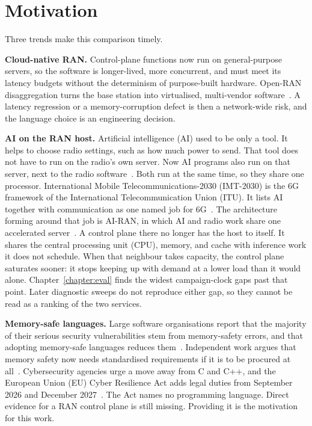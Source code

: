 \documentclass[english,oneside,a4paper,censored,csm,software-track-2020]{HYthesisML}
\begin{document}
\section{Motivation}\label{sec:motivation}
Three trends make this comparison timely.

\begin{compactitem}
\item \textbf{Cloud-native RAN.} Control-plane functions now run on general-purpose
servers, so the software is longer-lived, more concurrent, and must meet
its latency budgets without the determinism of purpose-built hardware.
Open-RAN disaggregation turns the base station into virtualised,
multi-vendor software~\cite{polese2023oran}. A latency regression or a
memory-corruption defect is then a network-wide risk, and the language
choice is an engineering decision.

\item \textbf{AI on the RAN host.} Artificial intelligence (AI) used to be only a tool.
It helps to choose radio settings, such as how much power to send. That tool does
not have to run on the radio's own server. Now AI programs also run on that
server, next to the radio software~\cite{polese2026airan}. Both run at the same
time, so they share one processor. International Mobile
Telecommunications-2030 (IMT-2030) is the 6G framework of the
International Telecommunication Union (ITU). It lists AI together with
communication as one named job for 6G~\cite{itu2023imt2030}. The architecture
forming around that job is AI-RAN, in which AI and radio work share one
accelerated server~\cite{airan2026orchestrator}. A control plane there
no longer has the host to itself. It shares the central processing unit
(CPU), memory, and cache with inference work it does not schedule. When
that neighbour takes capacity, the control plane saturates sooner: it
stops keeping up with demand at a lower load than it would alone.
Chapter~\ref{chapter:eval} finds the widest campaign-clock gaps past
that point. Later diagnostic sweeps do not reproduce either gap, so they
cannot be read as a ranking of the two services.

\item \textbf{Memory-safe languages.} Large software organisations report that the
majority of their serious security vulnerabilities stem from memory-safety errors,
and that adopting memory-safe languages reduces
them~\cite{msrc2019memory,google2022android,vanderstoep2025android,google2024securebydesign}.
Independent work argues that memory safety now needs standardised
requirements if it is to be procured at
all~\cite{watson2025memorysafety}. Cybersecurity agencies urge a move
away from C and C++, and the European Union (EU) Cyber Resilience Act
adds legal duties from September 2026 and December
2027~\cite{cisa2023memorysafe,oncd2024building,eu2024cra}. The Act names
no programming language. Direct evidence for a RAN control plane is
still missing. Providing it is the motivation for this work.
\end{compactitem}
\end{document}
